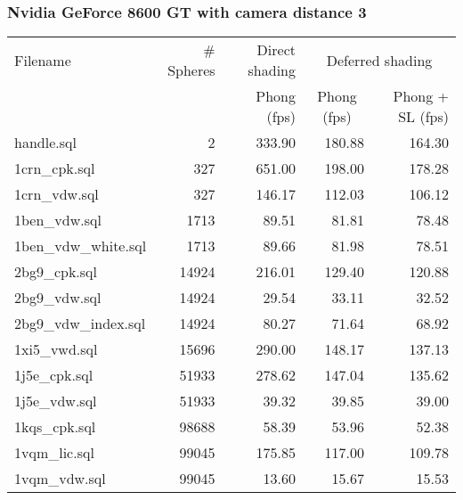\subsubsection*{Nvidia GeForce 8600 GT with camera distance 3}
\begin{tabular}{|l|r|r|r|r|}
\hline
Filename & \# Spheres & Direct shading & \multicolumn{2}{|c|}{Deferred shading} \\
         &            & Phong (fps)    & \multicolumn{1}{|c}{Phong (fps)} & Phong + SL (fps) \\  
\hline
\hline
handle.sql & 2 & 333.90 & 180.88 & 164.30 \\
\hline
1crn\_cpk.sql & 327 & 651.00 & 198.00 & 178.28 \\
\hline
1crn\_vdw.sql & 327 & 146.17 & 112.03 & 106.12 \\
\hline
1ben\_vdw.sql & 1713 & 89.51 & 81.81 & 78.48 \\
\hline
1ben\_vdw\_white.sql & 1713 & 89.66 & 81.98 & 78.51 \\
\hline
2bg9\_cpk.sql & 14924 & 216.01 & 129.40 & 120.88 \\
\hline
2bg9\_vdw.sql & 14924 & 29.54 & 33.11 & 32.52 \\
\hline
2bg9\_vdw\_index.sql & 14924 & 80.27 & 71.64 & 68.92 \\
\hline
1xi5\_vwd.sql & 15696 & 290.00 & 148.17 & 137.13 \\
\hline
1j5e\_cpk.sql & 51933 & 278.62 & 147.04 & 135.62 \\
\hline
1j5e\_vdw.sql & 51933 & 39.32 & 39.85 & 39.00 \\
\hline
1kqs\_cpk.sql & 98688 & 58.39 & 53.96 & 52.38 \\
\hline
1vqm\_lic.sql & 99045 & 175.85 & 117.00 & 109.78 \\
\hline
1vqm\_vdw.sql & 99045 & 13.60 & 15.67 & 15.53 \\
\hline
\end{tabular}
